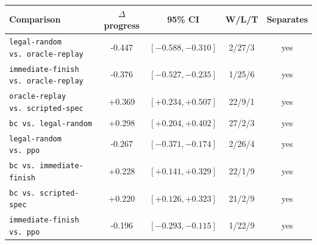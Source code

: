 \begin{tabular}{lcccc}
\toprule
Comparison & $\Delta$ progress & 95\% CI & W/L/T & Separates \\
\midrule
\texttt{legal-random vs.\ oracle-replay} & -0.447 & $[-0.588, -0.310]$ & 2/27/3 & yes \\
\texttt{immediate-finish vs.\ oracle-replay} & -0.376 & $[-0.527, -0.235]$ & 1/25/6 & yes \\
\texttt{oracle-replay vs.\ scripted-spec} & +0.369 & $[+0.234, +0.507]$ & 22/9/1 & yes \\
\texttt{bc vs.\ legal-random} & +0.298 & $[+0.204, +0.402]$ & 27/2/3 & yes \\
\texttt{legal-random vs.\ ppo} & -0.267 & $[-0.371, -0.174]$ & 2/26/4 & yes \\
\texttt{bc vs.\ immediate-finish} & +0.228 & $[+0.141, +0.329]$ & 22/1/9 & yes \\
\texttt{bc vs.\ scripted-spec} & +0.220 & $[+0.126, +0.323]$ & 21/2/9 & yes \\
\texttt{immediate-finish vs.\ ppo} & -0.196 & $[-0.293, -0.115]$ & 1/22/9 & yes \\
\bottomrule
\end{tabular}
